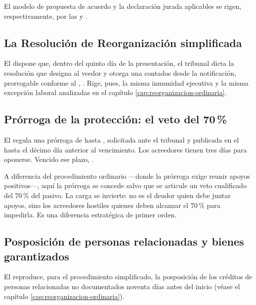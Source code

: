 El modelo de propuesta de acuerdo y la declaración jurada aplicables se rigen,
respectivamente, por las  \citeyearpar{ncg-24} y  \citeyearpar{ncg-23}.

\subsection{La Resolución de Reorganización simplificada}

El  dispone que, dentro del quinto día de la presentación, el tribunal dicta la
resolución que designa al veedor y otorga una \pfc{}  contados
desde la notificación, prorrogable conforme al , . Rige, pues, la misma inmunidad ejecutiva y la misma excepción
laboral analizadas en el capítulo \ref{cap:reorganizacion-ordinaria}.

\subsection{Prórroga de la protección: el veto del 70\,\%}

El  regula una prórroga de hasta , solicitada ante el
tribunal y publicada en el \boletin{} hasta el décimo día anterior al vencimiento. Los
acreedores tienen tres días para oponerse. Vencido ese plazo, .

\begin{foco}
A diferencia del procedimiento ordinario ---donde la prórroga exige reunir apoyos
positivos---, aquí la prórroga se concede salvo que se articule un veto cualificado del
70\,\% del pasivo. La carga se invierte: no es el deudor quien debe juntar apoyos, sino los
acreedores hostiles quienes deben alcanzar el 70\,\% para impedirla. Es una diferencia
estratégica de primer orden.
\end{foco}

\subsection{Posposición de personas relacionadas y bienes garantizados}

El  reproduce, para el procedimiento simplificado, la posposición de los créditos
de personas relacionadas no documentados noventa días antes del inicio (véase el capítulo
\ref{cap:reorganizacion-ordinaria}).


